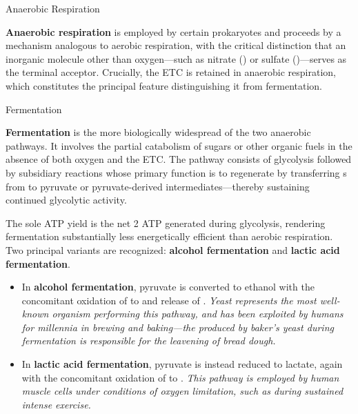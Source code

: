 \documentclass[10pt]{article}
\begin{document}
    \begin{core}{Anaerobic Respiration}

      \textbf{Anaerobic respiration} is employed by certain prokaryotes and proceeds by a mechanism analogous to aerobic respiration, with the critical distinction that an inorganic molecule other than oxygen---such as nitrate () or sulfate ()---serves as the terminal  acceptor. Crucially, the ETC is retained in anaerobic respiration, which constitutes the principal feature distinguishing it from fermentation.

    \end{core}

    \begin{core}{Fermentation}

      \textbf{Fermentation} is the more biologically widespread of the two anaerobic pathways. It involves the partial catabolism of sugars or other organic fuels in the absence of both oxygen and the ETC. The pathway consists of glycolysis followed by subsidiary reactions whose primary function is to regenerate  by transferring s from  to pyruvate or pyruvate-derived intermediates---thereby sustaining continued glycolytic activity.

      The sole ATP yield is the net 2 ATP generated during glycolysis, rendering fermentation substantially less energetically efficient than aerobic respiration. Two principal variants are recognized: \textbf{alcohol fermentation} and \textbf{lactic acid fermentation}.

      \begin{itemize}

        \item In \textbf{alcohol fermentation}, pyruvate is converted to ethanol with the concomitant oxidation of  to  and release of . \textit{Yeast represents the most well-known organism performing this pathway, and has been exploited by humans for millennia in brewing and baking---the  produced by baker's yeast during fermentation is responsible for the leavening of bread dough.}


        \item In \textbf{lactic acid fermentation}, pyruvate is instead reduced to lactate, again with the concomitant oxidation of  to . \textit{This pathway is employed by human muscle cells under conditions of oxygen limitation, such as during sustained intense exercise.}


      \end{itemize}

    \end{core}
\end{document}
